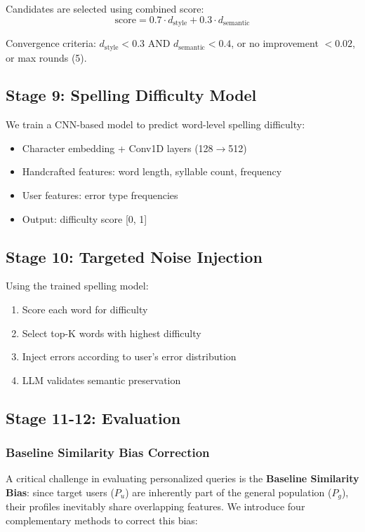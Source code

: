 \documentclass[11pt]{article}
\begin{document}
Candidates are selected using combined score:
\begin{equation}
\text{score} = 0.7 \cdot d_{\text{style}} + 0.3 \cdot d_{\text{semantic}}
\end{equation}

Convergence criteria: $d_{\text{style}} < 0.3$ AND $d_{\text{semantic}} < 0.4$, or no improvement $< 0.02$, or max rounds (5).

\subsection{Stage 9: Spelling Difficulty Model}

We train a CNN-based model to predict word-level spelling difficulty:
\begin{itemize}
    \item Character embedding + Conv1D layers (128$\rightarrow$512)
    \item Handcrafted features: word length, syllable count, frequency
    \item User features: error type frequencies
    \item Output: difficulty score [0, 1]
\end{itemize}

\subsection{Stage 10: Targeted Noise Injection}

Using the trained spelling model:
\begin{enumerate}
    \item Score each word for difficulty
    \item Select top-K words with highest difficulty
    \item Inject errors according to user's error distribution
    \item LLM validates semantic preservation
\end{enumerate}

\subsection{Stage 11-12: Evaluation}

\subsubsection{Baseline Similarity Bias Correction}

A critical challenge in evaluating personalized queries is the \textbf{Baseline Similarity Bias}: since target users ($P_u$) are inherently part of the general population ($P_g$), their profiles inevitably share overlapping features. We introduce four complementary methods to correct this bias:
\end{document}
